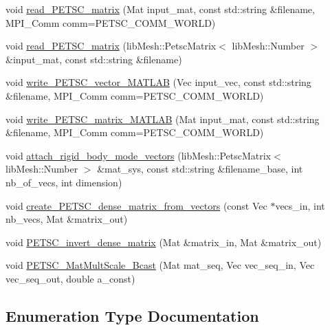 \begin{DoxyCompactItemize}
\item 
void \hyperlink{namespacecarl_ac9086ba3b6072efdbafaaa5ae53927de}{read\+\_\+\+P\+E\+T\+S\+C\+\_\+matrix} (Mat input\+\_\+mat, const std\+::string \&filename, M\+P\+I\+\_\+\+Comm comm=P\+E\+T\+S\+C\+\_\+\+C\+O\+M\+M\+\_\+\+W\+O\+R\+L\+D)
\item 
void \hyperlink{namespacecarl_ade169f15d51d4644e74276d155002f22}{read\+\_\+\+P\+E\+T\+S\+C\+\_\+matrix} (lib\+Mesh\+::\+Petsc\+Matrix$<$ lib\+Mesh\+::\+Number $>$ \&input\+\_\+mat, const std\+::string \&filename)
\item 
void \hyperlink{namespacecarl_a25d36e4c1615382a1832d73c716599db}{write\+\_\+\+P\+E\+T\+S\+C\+\_\+vector\+\_\+\+M\+A\+T\+L\+A\+B} (Vec input\+\_\+vec, const std\+::string \&filename, M\+P\+I\+\_\+\+Comm comm=P\+E\+T\+S\+C\+\_\+\+C\+O\+M\+M\+\_\+\+W\+O\+R\+L\+D)
\item 
void \hyperlink{namespacecarl_a1f15b2a953f4af7763e81b5f86505d6d}{write\+\_\+\+P\+E\+T\+S\+C\+\_\+matrix\+\_\+\+M\+A\+T\+L\+A\+B} (Mat input\+\_\+mat, const std\+::string \&filename, M\+P\+I\+\_\+\+Comm comm=P\+E\+T\+S\+C\+\_\+\+C\+O\+M\+M\+\_\+\+W\+O\+R\+L\+D)
\item 
void \hyperlink{namespacecarl_ab3dd1aab6c2bea1fcbb086eb6aff4d16}{attach\+\_\+rigid\+\_\+body\+\_\+mode\+\_\+vectors} (lib\+Mesh\+::\+Petsc\+Matrix$<$ lib\+Mesh\+::\+Number $>$ \&mat\+\_\+sys, const std\+::string \&filename\+\_\+base, int nb\+\_\+of\+\_\+vecs, int dimension)
\item 
void \hyperlink{namespacecarl_a40b4ba8a31197c1df5e1aa3438a46852}{create\+\_\+\+P\+E\+T\+S\+C\+\_\+dense\+\_\+matrix\+\_\+from\+\_\+vectors} (const Vec $\ast$vecs\+\_\+in, int nb\+\_\+vecs, Mat \&matrix\+\_\+out)
\item 
void \hyperlink{namespacecarl_aa3e9c0c8132625807ce645c290edf17f}{P\+E\+T\+S\+C\+\_\+invert\+\_\+dense\+\_\+matrix} (Mat \&matrix\+\_\+in, Mat \&matrix\+\_\+out)
\item 
void \hyperlink{namespacecarl_a561696085e75f9b5013bf61e2ef3de9f}{P\+E\+T\+S\+C\+\_\+\+Mat\+Mult\+Scale\+\_\+\+Bcast} (Mat mat\+\_\+seq, Vec vec\+\_\+seq\+\_\+in, Vec vec\+\_\+seq\+\_\+out, double a\+\_\+const)
\end{DoxyCompactItemize}


\subsection{Enumeration Type Documentation}
\hypertarget{namespacecarl_ad52f21755b51ffa926038b59ae194ea8}{}
